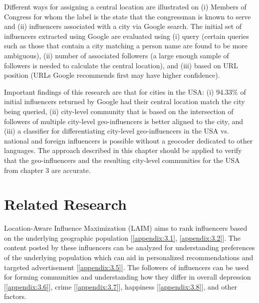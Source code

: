 Different ways for assigning a central location are illustrated on (i) Members of Congress for whom the label is the state that the congressman is known to serve and (ii) influencers associated with a city via Google search. The initial set of influencers extracted using Google are evaluated using (i) query (certain queries such as those that contain a city matching a person name are found to be more ambiguous), (ii) number of associated followers (a large enough sample of followers is needed to calculate the central location), and (iii) based on URL position (URLs Google recommends first may have higher confidence). 

Important findings of this research are that for cities in the USA: (i) 94.33\% of initial influencers returned by Google had their central location match the city being queried, (ii) city-level community that is based on the intersection of followers of multiple city-level geo-influencers is better aligned to the city, and (iii) a classifier for differentiating city-level geo-influencers in the USA vs. national and foreign influencers is possible without a geocoder dedicated to other languages. The approach described in this chapter should be applied to verify that the geo-influencers and the resulting city-level communities for the USA from chapter 3 are accurate.

\section{Related Research}
Location-Aware Influence Maximization (LAIM) aims to rank influencers based on the underlying geographic population [\ref{appendix:3.1}, \ref{appendix:3.2}]. %
The content posted by these influencers can be analyzed for understanding preferences of the underlying population which can aid in personalized recommendations and targeted advertisement [\ref{appendix:3.5}]. The followers of influencers can be used for forming communities and understanding how they differ in overall depression [\ref{appendix:3.6}], crime [\ref{appendix:3.7}], happiness [\ref{appendix:3.8}], and other factors.

